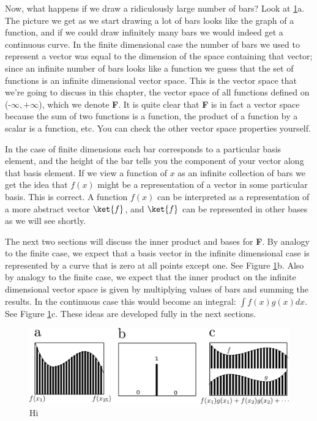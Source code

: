Now, what happens if we draw a ridiculously large number of bars?  Look at \ref{Fig:columnsInfinite}a.  The picture we get as we start drawing a lot of bars looks like the graph of a function, and if we could draw infinitely many bars we would indeed get a continuous curve.  In the finite dimensional case the number of bars we used to represent a vector was equal to the dimension of the space containing that vector; since an infinite number of bars looks like a function we guess that the set of functions is an infinite dimensional vector space.  This is the vector space that we're going to discuss in this chapter, the vector space of all functions defined on (-$\infty,+\infty$), which we denote \textbf{F}.  It is quite clear that \textbf{F} is in fact a vector space because the sum of two functions is a function, the product of a function by a scalar is a function, etc.  You can check the other vector space properties yourself.

In the case of finite dimensions each bar corresponds to a particular basis element, and the height of the bar tells you the component of your vector along that basis element. If we view a function of $x$ as an infinite collection of bars we get the idea that $f(x)$ might be a representation of a vector in some particular basis. This is correct. A function $f(x)$ can be interpreted as a representation of a more abstract vector $\ket{f}$, and $\ket{f}$ can be represented in other bases as we will see shortly.

The next two sections will discuss the inner product and bases for \textbf{F}. By analogy to the finite case, we expect that a basis vector in the infinite dimensional case is represented by a curve that is zero at all points except one. See Figure \ref{Fig:columnsInfinite}b. Also by analogy to the finite case, we expect that the inner product on the infinite dimensional vector space is given by multiplying values of bars and summing the results. In the continuous case this would become an integral: $\int f(x)g(x)dx$. See Figure \ref{Fig:columnsInfinite}c. These ideas are developed fully in the next sections.

\begin{figure}
\begin{centering}
\includegraphics[width=12cm]{columns_infinite.pdf}
\par\end{centering}
\caption{Hi}
\label{Fig:columnsInfinite}
\end{figure}

